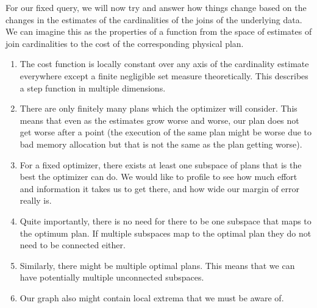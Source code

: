 \documentclass[sigconf,nonacm]{acmart}
\begin{document}
For our fixed query, we will now try and answer how things change based on the changes in the estimates of the cardinalities of the joins of the underlying data. We can imagine this as the properties of a function from the space of estimates of join cardinalities to the cost of the corresponding physical plan. 

\begin{enumerate}
    \item The cost function is locally constant over any axis of the cardinality estimate everywhere except a finite negligible set measure theoretically. This describes a step function in multiple dimensions. 
    \item There are only finitely many plans which the optimizer will consider. This means that even as the estimates grow worse and worse, our plan does not get worse after a point (the execution of the same plan might be worse due to bad memory allocation but that is not the same as the plan getting worse). 
    \item For a fixed optimizer, there exists at least one subspace of plans that is the best the optimizer can do. We would like to profile to see how much effort and information it takes us to get there, and how wide our margin of error really is. 
    \item Quite importantly, there is no need for there to be one subspace that maps to the optimum plan. If multiple subspaces map to the optimal plan they do not need to be connected either. 
    \item Similarly, there might be multiple optimal plans. This means that we can have potentially multiple unconnected subspaces. 
    \item Our graph also might contain local extrema that we must be aware of. 
\end{enumerate}
\end{document}
